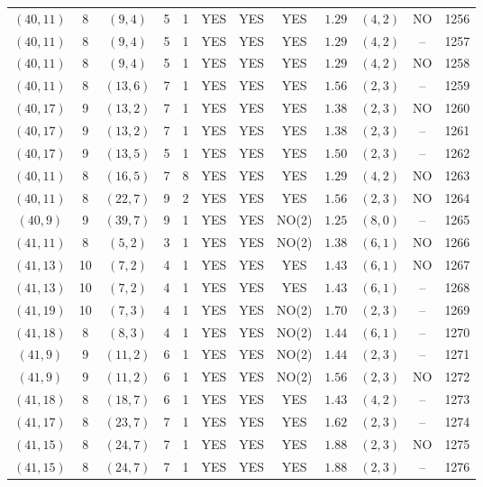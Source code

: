 \begin{longtable}{|c|c|c|c|c|c|c|c|c|c|c|c|}
$(40,11)$ & 8 & $(9,4)$ & 5 & 1 & YES & YES & YES & $1.29$ & $(4,2)$ & NO & 1256\\
$(40,11)$ & 8 & $(9,4)$ & 5 & 1 & YES & YES & YES & $1.29$ & $(4,2)$ & -- & 1257\\
$(40,11)$ & 8 & $(9,4)$ & 5 & 1 & YES & YES & YES & $1.29$ & $(4,2)$ & NO & 1258\\
$(40,11)$ & 8 & $(13,6)$ & 7 & 1 & YES & YES & YES & $1.56$ & $(2,3)$ & -- & 1259\\
$(40,17)$ & 9 & $(13,2)$ & 7 & 1 & YES & YES & YES & $1.38$ & $(2,3)$ & NO & 1260\\
$(40,17)$ & 9 & $(13,2)$ & 7 & 1 & YES & YES & YES & $1.38$ & $(2,3)$ & -- & 1261\\
$(40,17)$ & 9 & $(13,5)$ & 5 & 1 & YES & YES & YES & $1.50$ & $(2,3)$ & -- & 1262\\
$(40,11)$ & 8 & $(16,5)$ & 7 & 8 & YES & YES & YES & $1.29$ & $(4,2)$ & NO & 1263\\
$(40,11)$ & 8 & $(22,7)$ & 9 & 2 & YES & YES & YES & $1.56$ & $(2,3)$ & NO & 1264\\
$(40,9)$ & 9 & $(39,7)$ & 9 & 1 & YES & YES & NO(2) & $1.25$ & $(8,0)$ & -- & 1265\\
$(41,11)$ & 8 & $(5,2)$ & 3 & 1 & YES & YES & NO(2) & $1.38$ & $(6,1)$ & NO & 1266\\
$(41,13)$ & 10 & $(7,2)$ & 4 & 1 & YES & YES & YES & $1.43$ & $(6,1)$ & NO & 1267\\
$(41,13)$ & 10 & $(7,2)$ & 4 & 1 & YES & YES & YES & $1.43$ & $(6,1)$ & -- & 1268\\
$(41,19)$ & 10 & $(7,3)$ & 4 & 1 & YES & YES & NO(2) & $1.70$ & $(2,3)$ & -- & 1269\\
$(41,18)$ & 8 & $(8,3)$ & 4 & 1 & YES & YES & NO(2) & $1.44$ & $(6,1)$ & -- & 1270\\
$(41,9)$ & 9 & $(11,2)$ & 6 & 1 & YES & YES & NO(2) & $1.44$ & $(2,3)$ & -- & 1271\\
$(41,9)$ & 9 & $(11,2)$ & 6 & 1 & YES & YES & NO(2) & $1.56$ & $(2,3)$ & NO & 1272\\
$(41,18)$ & 8 & $(18,7)$ & 6 & 1 & YES & YES & YES & $1.43$ & $(4,2)$ & -- & 1273\\
$(41,17)$ & 8 & $(23,7)$ & 7 & 1 & YES & YES & YES & $1.62$ & $(2,3)$ & -- & 1274\\
$(41,15)$ & 8 & $(24,7)$ & 7 & 1 & YES & YES & YES & $1.88$ & $(2,3)$ & NO & 1275\\
$(41,15)$ & 8 & $(24,7)$ & 7 & 1 & YES & YES & YES & $1.88$ & $(2,3)$ & -- & 1276\\

\end{longtable}
